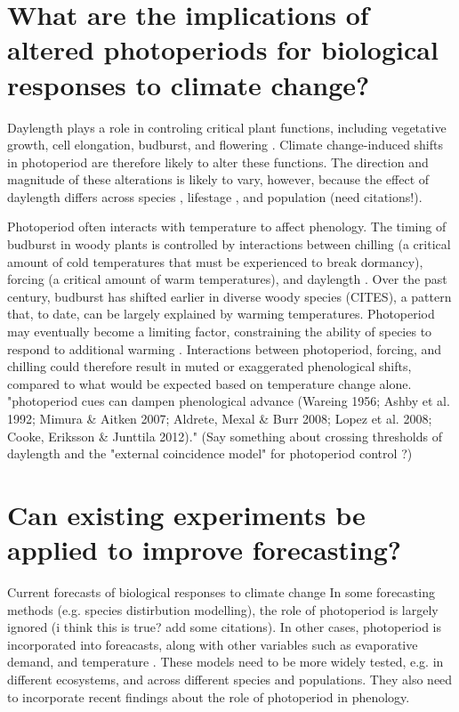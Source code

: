 \documentclass{article}
\begin{document}
\section*{What are the implications of altered photoperiods for biological responses to climate change?}
\par Daylength plays a role in controling critical plant functions, including vegetative growth, cell elongation, budburst, and flowering \citep{Linkosalo:2006aa,erwin1998,sidaway2010, Hsu:2011,Heide:2011aa,Ashby:1962aa,Heide:2012aa}. Climate change-induced shifts in photoperiod are therefore likely to alter these functions. The direction and magnitude of these alterations is likely to vary, however, because the effect of daylength differs across species \citep{Sanz-Perez:2009aa, zohner2016}, lifestage \citep{Partanen:2005aa}, and population (need citations!).  
\par Photoperiod often interacts with temperature to affect phenology. The timing of budburst in woody plants is controlled by interactions between chilling (a critical amount of cold temperatures that must be experienced to break dormancy), forcing (a critical amount of warm temperatures), and daylength \citep{flynn2018,Heide:2008aa, zohner2016}. Over the past century, budburst has shifted earlier in diverse woody species (CITES), a pattern that, to date, can be largely explained by warming temperatures. Photoperiod may eventually become a limiting factor, constraining the ability of species to respond to additional warming \citep{koerner2010b,vitasse2013, Morin:2010aa,Nienstaedt:1966aa}. Interactions between photoperiod, forcing, and chilling could therefore result in muted or exaggerated phenological shifts, compared to what would be expected based on temperature change alone.  "photoperiod cues can dampen phenological advance (Wareing 1956; Ashby et al. 1992; Mimura \& Aitken 2007; Aldrete, Mexal \& Burr
2008; Lopez et al. 2008;  Cooke, Eriksson \& Junttila 2012)." 
(Say something about crossing thresholds of daylength and the "external coincidence model" for photoperiod control \citep{bastow2002,kobayashi2007,andres2012,Singh:2017}?)

\section*{Can existing experiments be applied to improve forecasting?}
\par Current forecasts of biological responses to climate change In some forecasting methods (e.g. species distirbution modelling), the role of photoperiod is largely ignored (i think this is true? add some citations). In other cases, photoperiod is incorporated into foreacasts, along with other variables such as evaporative demand, and temperature \citep [e.g. ED] []{jolly2005, medvigy2013}. These models need to be more widely tested, e.g. in different ecosystems, and across different species and populations. They also need to incorporate recent findings about the role of photoperiod in phenology.     
\end{document}
